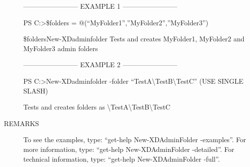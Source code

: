 \documentclass[letterpaper,10pt,english]{sphinxmanual}
\begin{document}
\begin{description}
\begin{description}
\end{description}

————————\textendash{} EXAMPLE 1 ————————\textendash{}

PS C:\textgreater{}\$folders = @(“MyFolder1”,”MyFolder2”,”MyFolder3”)

\$folders\textbar{}New-XDadminfolder
Tests and creates MyFolder1, MyFolder2 and MyFolder3 admin folders

————————\textendash{} EXAMPLE 2 ————————\textendash{}

PS C:\textgreater{}New-XDadminfolder -folder “TestA\textbackslash{}TestB\textbackslash{}TestC” (USE SINGLE SLASH)

Tests and creates folders as \textbackslash{}TestA\textbackslash{}TestB\textbackslash{}TestC

\item[{REMARKS}] \leavevmode
To see the examples, type: “get-help New-XDAdminFolder -examples”.
For more information, type: “get-help New-XDAdminFolder -detailed”.
For technical information, type: “get-help New-XDAdminFolder -full”.

\end{description}
\end{document}
